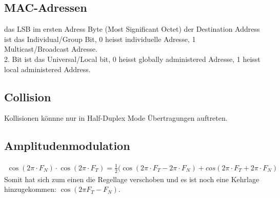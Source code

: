 \subsection{MAC-Adressen}
das LSB im ersten Adress Byte (Most Significant Octet) der Destination Address ist das Individual/Group Bit, 0 heisst individuelle Adresse, 1 Multicast/Broadcast Adresse.\\
2. Bit ist das Universal/Local bit, 0 heisst globally administered Adresse, 1 heisst local administered Address.

\subsection{Collision}
Kollisionen könnne nur in Half-Duplex Mode Übertragungen auftreten.


\subsection{Amplitudenmodulation}
\begin{align*}
\cos (2\pi \cdot F_N) \cdot \cos (2\pi \cdot F_T)
= \frac{1}{2}(\cos (2\pi \cdot F_T - 2\pi \cdot F_N) + cos(2\pi \cdot F_T + 2\pi \cdot F_N)
\end{align*}
Somit hat sich zum einen die Regellage verschoben und es ist noch eine Kehrlage hinzugekommen: $\cos (2\pi F_T - F_N)$.
